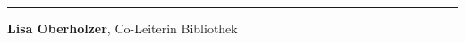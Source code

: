 \begin{center}\rule{0.5\linewidth}{\linethickness}\end{center}

\textbf{Lisa Oberholzer}, Co-Leiterin Bibliothek
